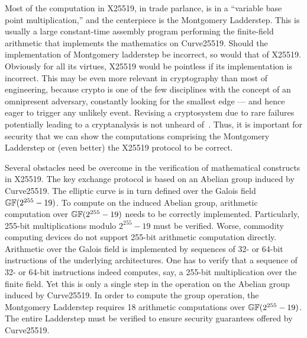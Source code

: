 Most of the computation in X25519, in trade parlance, is in a
``variable base point multiplication,'' and the centerpiece 
is the Montgomery Ladderstep. This is usually a
large constant-time assembly program performing the
finite-field arithmetic that implements the mathematics on Curve25519.
Should the implementation of Montgomery ladderstep be incorrect, so
would that of X25519. Obviously for all its virtues, X25519 would be
pointless if its implementation is incorrect. This may be even more
relevant in cryptography than most of engineering, because crypto is
one of the few disciplines with the concept of an omnipresent
adversary, constantly looking for the smallest edge --- and hence
eager to trigger any unlikely event. Revising a cryptosystem
due to rare failures potentially leading to a cryptanalysis is not
unheard of~\cite{HNPPSSW:03:IDFSNE}.
Thus, it is important for security that we can show the computations
comprising the Montgomery Ladderstep or (even better) the X25519
protocol to be correct. 

Several obstacles need be overcome in the verification of mathematical
constructs in X25519. The key exchange protocol is based on an
Abelian group induced by Curve25519. The elliptic
curve is in turn defined over the Galois field $\mathbb{GF}(2^{255} - 19)$. 
To compute on the induced Abelian group, arithmetic computation over
$\mathbb{GF}(2^{255} - 19)$ needs to be correctly implemented. 
Particularly, 255-bit multiplications modulo
$2^{255} - 19$ must be verified. Worse, commodity computing devices do
not support 255-bit arithmetic computation directly. Arithmetic over
the Galois field is implemented by sequences of 32- or 64-bit
instructions of the underlying architectures. One has to
verify that a sequence of 32- or 64-bit instructions indeed
computes, say, a 255-bit multiplication over the finite field. Yet this
is only a single step in the operation on the Abelian group induced by
Curve25519. In order to compute the group operation, 
the Montgomery Ladderstep requires 18 arithmetic 
computations over $\mathbb{GF}(2^{255} - 19)$. The entire Ladderstep must be
verified to ensure security guarantees offered by Curve25519.


